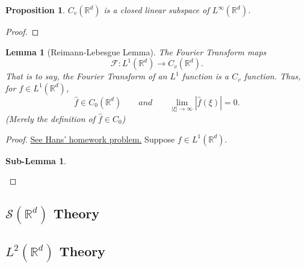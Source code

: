 \documentclass[letterpaper,twoside,12pt]{article}
\theoremstyle{mystyle}
\newtheorem{lemma}[theorem]{Lemma}
\newtheorem{slem}{Sub-Lemma}
\newtheorem{prop}{Proposition}[section]
\newcommand{\R}{{\mathbb R}}
\newcommand{\cg}{\color{gray}}
\newcommand{\cbk}{\color{black}}
\begin{document}
\begin{prop}
  $C_v\left( \R^d \right)$ is a closed linear subspace of $L^\infty\left( \R^d \right)$. 
\end{prop}
\begin{proof}
  
\end{proof}

\begin{lemma}[Reimann-Lebesgue Lemma]
  The Fourier Transform maps 
  \[\mathcal{F}:{L^1}\left( {{\mathbb{R}^d}} \right) \to {C_v}\left( {{\mathbb{R}^d}} \right).\]
  \cg That is to say, the Fourier Transform of an $L^1$ function is a $C_v$ function. \cbk Thus, for $f\in L^1\left( \R^d \right)$, 
  \[\hat f \in {C_0}\left( {{\mathbb{R}^d}} \right)\qquad and\qquad \mathop {\lim }\limits_{\left| \xi  \right| \to \infty } \left| {\hat f\left( \xi  \right)} \right| = 0.\] (Merely the definition of $\hat f \in C_0$)
\end{lemma}
\begin{proof}
  \href{https://web.ma.utexas.edu/users/koch/teaching/M383C-F22/access/M383C-F22-HW2-Solutions.pdf}{See Hans' homework problem.} Suppose $f \in L^1\left( \R^d \right)$. 

\begin{slem}
\end{slem}



\end{proof}































\subsection{$\mathcal S \left( \R^d \right)$ Theory}

\subsection{$L^2\left( \R^d \right)$ Theory}
\end{document}
